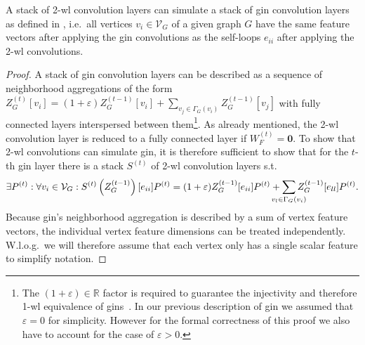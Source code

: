 \begin{thm}
	A stack of 2-\acs{wl} convolution layers can simulate a stack of \ac{gin} convolution layers as defined in , i.e.\ all vertices $v_i \in \mathcal{V}_G$ of a given graph $G$ have the same feature vectors after applying the \ac{gin} convolutions as the self-loops $e_{ii}$ after applying the 2-\acs{wl} convolutions.
\end{thm}
\begin{proof}
	A stack of \ac{gin} convolution layers can be described as a sequence of neighborhood aggregations of the form $Z_G^{(t)}[v_i] = (1 + \varepsilon) Z_G^{(t-1)}[v_i] + \sum_{v_j \in \Gamma_G(v_i)} Z_G^{(t-1)}[v_j]$ with fully connected layers interspersed between them\footnote{
		The $(1 + \varepsilon) \in \mathbb{R}$ factor is required to guarantee the injectivity and therefore 1-\acs{wl} equivalence of \acp{gin}~\cite{Xu2018}.
		In our previous description of \ac{gin} we assumed that $\varepsilon = 0$ for simplicity.
		However for the formal correctness of this proof we also have to account for the case of $\varepsilon > 0$.
	}.
	As already mentioned, the 2-\acs{wl} convolution layer is reduced to a fully connected layer if $W_{F}^{(t)} = \mathbf{0}$.
	To show that 2-\acs{wl} convolutions can simulate \ac{gin}, it is therefore sufficient to show that for the $t$-th \ac{gin} layer there is a stack $S^{(t)}$ of 2-\ac{wl} convolution layers s.t.\ %
	\begin{align*}
		\exists P^{(t)}: \forall v_i \in \mathcal{V}_G: S^{(t)}\left(Z_{G}^{(t-1)}\right)[e_{ii}] P^{(t)} = (1 + \varepsilon) Z_{G}^{(t-1)}[e_{ii}] P^{(t)} + \smashoperator[lr]{\sum_{v_l \in \Gamma_G(v_i)}} Z_{G}^{(t-1)}[e_{ll}] P^{(t)}
		\text{.}
	\end{align*}
	Because \ac{gin}'s neighborhood aggregation is described by a sum of vertex feature vectors, the individual vertex feature dimensions can be treated independently.
	W.l.o.g.\ we will therefore assume that each vertex only has a single scalar feature to simplify notation.


\end{proof}
